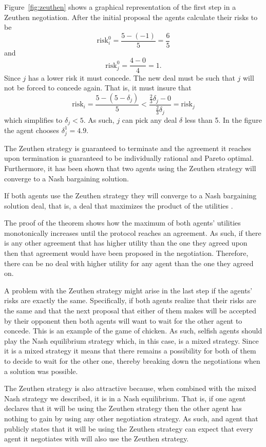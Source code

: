 Figure~\ref{fig:zeuthen} shows a graphical representation of the first
step in a Zeuthen negotiation. After the initial proposal the agents
calculate their risks to be
\[\text{risk}_i^0 = \frac{5 - (-1)}{5} = \frac{6}{5}\]
and
\[\text{risk}_j^0=\frac{4 - 0}{4} = 1.\] Since $j$ has a lower risk it
must concede. The new deal must be such that $j$ will not be forced to
concede again. That is, it must insure that
\[\text{risk}_i = \frac{5 - (5 - \delta_j)}{5} < \frac{\frac{2}{3}\delta_j
  - 0}{\frac{2}{3}\delta_j} = \text{risk}_j \] which simplifies to
$\delta_j < 5$. As such, $j$ can pick any deal $\delta$ less than 5.
In the figure the agent chooses $\delta_j^1 = 4.9$.

The Zeuthen strategy is guaranteed to terminate and the agreement it
reaches upon termination is guaranteed to be individually rational and
Pareto optimal.  Furthermore, it has been shown that two agents using
the Zeuthen strategy will converge to a Nash bargaining solution.

\begin{theorem}
  If both agents use the Zeuthen strategy they will converge to a Nash
  bargaining solution deal, that is, a deal that maximizes the product
  of the utilities \cite{harsanyi65a}.
\end{theorem}
The proof of the theorem shows how the maximum of both agents'
utilities monotonically increases until the protocol reaches an
agreement. As such, if there is any other agreement that has higher
utility than the one they agreed upon then that agreement would have
been proposed in the negotiation. Therefore, there can be no deal with
higher utility for any agent than the one they agreed on.

\medskip

A problem with the Zeuthen strategy might arise in the last step if
the agents' risks are exactly the same. Specifically, if both agents
realize that their risks are the same and that the next proposal that
either of them makes will be accepted by their opponent then both
agents will want to wait for the other agent to concede. This is an
example of the game of chicken. As such, selfish agents should play
the Nash equilibrium strategy which, in this case, is a mixed
strategy. Since it is a mixed strategy it means that there remains a
possibility for both of them to decide to wait for the other one,
thereby breaking down the negotiations when a solution was possible.

The Zeuthen strategy is also attractive because, when
combined with the mixed Nash strategy we described, it is in a Nash
equilibrium. That is, if one agent declares that it will be using the
Zeuthen strategy then the other agent has nothing to gain by using any
other negotiation strategy. As such, and agent that publicly states
that it will be using the Zeuthen strategy can expect that every agent
it negotiates with will also use the Zeuthen strategy. 


